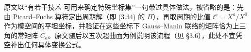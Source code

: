 \begin{yizhu}[含糊点]
原文以“有若干技术 \cite{ref50,ref57,ref58,ref51,ref60,ref61,ref62,ref63,ref28} 可用来确定特殊坐标集”一句带过具体做法，被省略的是：先由 Picard--Fuchs 算符定出周期解（即 (3.34) 的 $\Pi$），再取周期的比值 $t^a=X^a/X^0$ 作为模空间的平坦坐标，并验证在这些坐标下 Gauss--Manin 联络的矩阵恰为上三角的常矩阵 $C_a$。原文随后以五次超曲面为例说明该流程（见 §3.6），此处不宜凭空补出任何具体变换公式。
\end{yizhu}

